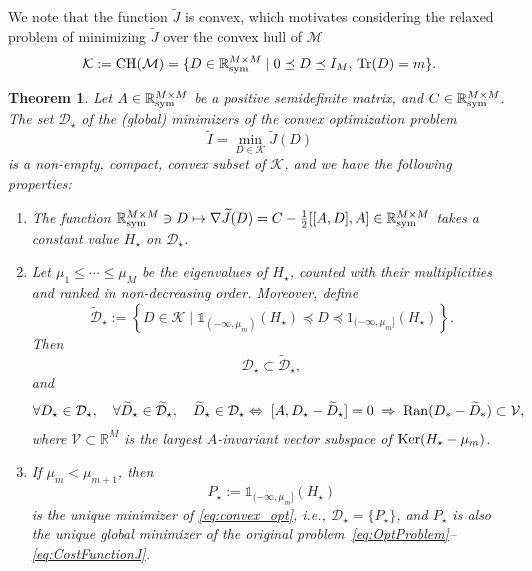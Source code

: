 \documentclass{article}
\def\R{\mathbb R}
\newtheorem{theorem}{Theorem}
\newcommand{\tr}{{\rm Tr}}
\newcommand{\1}{{\mathds 1}}
\begin{document}
We note that the function $\widetilde J$ is convex, which motivates considering the relaxed problem of minimizing $\widetilde J$ over the convex hull of $\mathcal M$
$$
\mathcal K:={\rm CH}(\mathcal M)=\{ D \in \R^{M \times M}_{\rm sym} \; | \; 0 \preceq D \preceq I_M, \, \tr(D)=m \}.
$$
\begin{theorem}
\label{thm:convex_pbm}
Let $A \in \R^{M \times M}_{\rm sym}$ be a positive semidefinite matrix, and $C \in \R^{M \times M}_{\rm sym}$.
The set $\mathcal D_\star$ of the (global) minimizers of the convex optimization problem
\begin{equation} \label{eq:convex_opt}
   \widetilde I= \min_{D \in \mathcal K} \widetilde J(D)
\end{equation}
is a non-empty, compact, convex subset of $\mathcal K$, and we have the following properties:
\begin{enumerate}
    \item The function $\R^{M\times M}_{\rm sym} \ni D \mapsto \nabla \widetilde J(D)=C- \frac 12[[A,D],A] \in \R^{M \times M}_{\rm sym}$ takes a constant value $H_\star$ on $\mathcal D_\star$.
    \item Let $\mu_1 \le \cdots \le \mu_M$ be the eigenvalues of $H_\star$, counted with their multiplicities and ranked in non-decreasing order. Moreover, define 
    \begin{equation*}
        \widetilde {\mathcal D}_\star:= \left\{ D \in \mathcal K \; | \;  \mathds 1_{(-\infty,\mu_m)}(H_\star) \preceq D \preceq 1_{(-\infty,\mu_m]}(H_\star) \right\}.
    \end{equation*}
    Then
    \begin{equation} \label{eq:DsubsetDtilde}
        {\mathcal D}_\star \subset \widetilde {\mathcal D}_\star,
    \end{equation}
    and 
    \begin{align}
    \forall D_\star \in \mathcal D_\star, \quad \forall \widetilde D_\star \in \widetilde{\mathcal D}_\star, \quad \widetilde D_\star \in \mathcal D_\star \Leftrightarrow \;  [A,D_\star-\widetilde D_\star]=0 \;   \Rightarrow  \;  {\rm Ran}(D_*-\widetilde D_*) \subset \mathcal V, \label{eq:charac_D_star}
    \end{align}
    where $\mathcal V \subset \R^M$ is the largest $A$-invariant vector subspace of ${\rm Ker}(H_\star-\mu_m)$.
\item If $\mu_m < \mu_{m+1}$, then 
\begin{equation}
    P_\star:= \mathds 1_{(-\infty,\mu_m]}(H_\star)
\end{equation}
is the unique minimizer of \eqref{eq:convex_opt}, i.e., $\mathcal D_\star=\{P_\star\}$, and $P_\star$ is also the unique global minimizer of the original problem~\eqref{eq:OptProblem}--\eqref{eq:CostFunctionJ}.
\end{enumerate}
\end{theorem}
\end{document}
